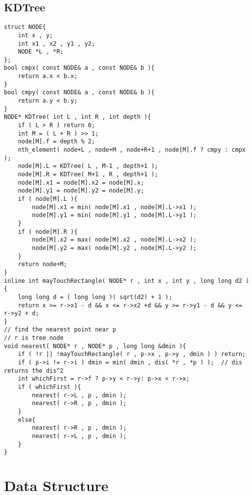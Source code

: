 \documentclass[11pt,twocolumn,a4paper]{article}
\begin{document}
\subsection{KDTree}
\begin{lstlisting}[label=KDTree]
struct NODE{
	int x , y;
	int x1 , x2 , y1 , y2;
	NODE *L , *R;
};
bool cmpx( const NODE& a , const NODE& b ){
	return a.x < b.x;
}
bool cmpy( const NODE& a , const NODE& b ){
	return a.y < b.y;
}
NODE* KDTree( int L , int R , int depth ){
	if ( L > R ) return 0;
	int M = ( L + R ) >> 1;
	node[M].f = depth % 2;
	nth_element( node+L , node+M , node+R+1 , node[M].f ? cmpy : cmpx );
	node[M].L = KDTree( L , M-1 , depth+1 );
	node[M].R = KDTree( M+1 , R , depth+1 );
	node[M].x1 = node[M].x2 = node[M].x;
	node[M].y1 = node[M].y2 = node[M].y;
	if ( node[M].L ){
		node[M].x1 = min( node[M].x1 , node[M].L->x1 );
		node[M].y1 = min( node[M].y1 , node[M].L->y1 );
	}
	if ( node[M].R ){
		node[M].x2 = max( node[M].x2 , node[M].L->x2 );
		node[M].y2 = max( node[M].y2 , node[M].L->y2 );
	}
	return node+M;
} 
inline int mayTouchRectangle( NODE* r , int x , int y , long long d2 ){
	long long d = ( long long )( sqrt(d2) + 1 );
	return x >= r->x1 - d && x <= r->x2 +d && y >= r->y1 - d && y <= r->y2 + d;
}
// find the nearest point near p
// r is tree node
void nearest( NODE* r , NODE* p , long long &dmin ){
	if ( !r || !mayTouchRectangle( r , p->x , p->y , dmin ) ) return;
	if ( p->i != r->i ) dmin = min( dmin , dis( *r , *p ) );  // dis returns the dis^2
	int whichFirst = r->f ? p->y < r->y: p->x < r->x;
	if ( whichFirst ){
		nearest( r->L , p , dmin );
		nearest( r->R , p , dmin );
	}
	else{
		nearest( r->R , p , dmin );
		nearest( r->L , p , dmin );
	}
}
\end{lstlisting}


\newpage
\section{Data Structure}
\end{document}
